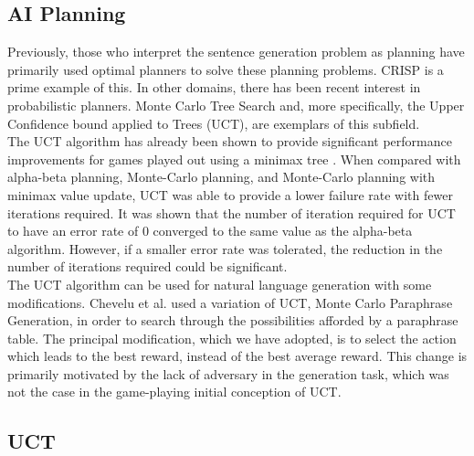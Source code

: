 \subsection{AI Planning}

Previously, those who interpret the sentence generation problem as planning have primarily used optimal planners to solve these planning problems.  CRISP is a prime example of this.  In other domains, there has been recent interest in probabilistic planners.  Monte Carlo Tree Search and, more specifically, the Upper Confidence bound applied to Trees (UCT), are exemplars of this subfield.\\

The UCT algorithm has already been shown to provide significant performance improvements for games played out using a minimax tree \cite{kocsis_bandit_2006}.  When compared with alpha-beta planning, Monte-Carlo planning, and Monte-Carlo planning with minimax value update, UCT was able to provide a lower failure rate with fewer iterations required.  It was shown that the number of iteration required for UCT to have an error rate of 0 converged to the same value as the alpha-beta algorithm.  However, if a smaller error rate was tolerated, the reduction in the number of iterations required could be significant.\\

The UCT algorithm can be used for natural language generation with some modifications.  Chevelu et al. \cite{chevelu_introduction_2009} used a variation of UCT, Monte Carlo Paraphrase Generation, in order to search through the possibilities afforded by a paraphrase table.  The principal modification, which we have adopted, is to select the action which leads to the best reward, instead of the best average reward.  This change is primarily motivated by the lack of adversary in the generation task, which was not the case in the game-playing initial conception of UCT.
\subsection{UCT}

